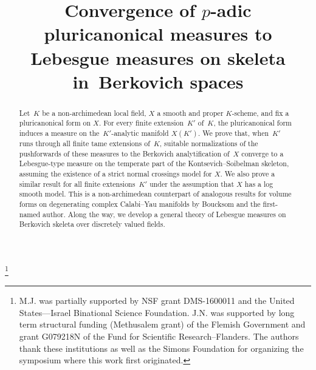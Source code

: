 \documentclass[JEP,XML,SOM,Unicode,NoFloatCountersInSection]{cedram}
\theoremstyle{definition}
\numberwithin{equation}{subsection}
\begin{document}
\frontmatter

\title[Convergence of $p$-adic pluricanonical measures]{Convergence of $p$-adic pluricanonical measures to Lebesgue measures on skeleta in~Berkovich spaces}

\author[\initial{M.} \lastname{Jonsson}]{ }
\address{Dept of Mathematics, University of Michigan\\
Ann Arbor, MI 48109-1043, USA}

\author[\initial{J.} \lastname{Nicaise}]{ }
\address{Imperial College, Department of Mathematics\\
South Kensington Campus, London SW72AZ, UK\\
and\\
KU Leuven, Department of Mathematics\\
Celestijnenlaan 200B, 3001 Heverlee, Belgium} 

\thanks{M.J. was partially supported by NSF grant DMS-1600011 and the United States---Israel Binational Science Foundation. J.N. was supported by long term structural funding (Methusalem grant) of the Flemish Government and grant G079218N of the Fund for Scientific Research--Flanders. The authors thank these institutions as well as the Simons Foundation for organizing the symposium where this work first originated.}

\begin{abstract}
Let~$K$ be a non-archimedean local field, $X$ a smooth and proper $K$\nobreakdash-scheme, and fix a pluricanonical form on $X$.
For every finite extension~$K'$ of~$K$, the pluricanonical form induces a measure on the~$K'$-analytic manifold $X(K')$.
We prove that, when~$K'$ runs through all finite tame extensions of~$K$, suitable normalizations of the pushforwards of these measures to the Berkovich analytification of~$X$ converge to a Lebesgue-type measure on the temperate part of the Kontsevich--Soibelman skeleton, assuming the existence of a strict normal crossings model for $X$. We also prove a similar result for all finite extensions~$K'$ under the assumption that $X$ has a log smooth model. This is a non-archimedean counterpart of analogous results for volume forms on degenerating complex Calabi--Yau manifolds by Boucksom and the first-named author. Along the way, we develop a general theory of Lebesgue measures on Berkovich skeleta over discretely valued fields.
\end{abstract}
\end{document}
